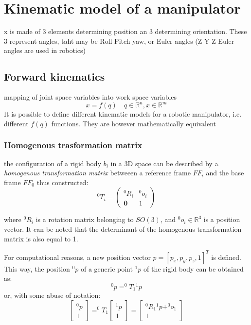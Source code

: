 \documentclass{book}
\begin{document}
\section{Kinematic model of a manipulator}

x is made of 3 elements determining position an 3 determining orientation. These 3 represent angles, taht may be Roll-Pitch-yaw, or Euler angles (Z-Y-Z Euler angles are used in robotics) 

\subsection{Forward kinematics}
mapping of joint space variables into work space variables
\[
    x=f(q) \quad q\in \mathbb{R}^n, x\in \mathbb{R}^m
\]
It is possible to define different kinematic models for a robotic manipulator, i.e. different $f(q)$ functions. They are however mathematically equivalent
\subsubsection{Homogenous trasformation matrix}
the configuration of a rigid body $b_i$ in a 3D space can be described by a \emph{homogenous transformation matrix} betweeen a reference frame $FF_i$ and the base frame $FF_0$ thus constructed: 
\[
    ^0T_i=\begin{pmatrix}
        ^0R_i & ^0o_i\\
        \mathbf{0} & 1
    \end{pmatrix}
\]

where $^0R_i$ is a rotation matrix belonging to $SO(3)$, and $^0o_i\in\mathbb{R}^3$ is a position vector. It can be noted that the determinant of the homogenous transformation matrix is also equal to 1.

For computational reasons, a new position vector $p=[p_x,p_y,p_z,1]^T$ is defined. This way, the position $^0p$ of a generic point $^1p$ of the rigid body can be obtained as:
\[
    ^0p=^0T_1 {^1}p
\]
or, with some abuse of notation:
\[
    \begin{bmatrix}
        ^0p \\ 1
    \end{bmatrix} = ^0T_1 \begin{bmatrix}
        ^1p \\ 1
    \end{bmatrix} = \begin{bmatrix}
        ^0R_1 {^1}p + ^0o_1\\
        1
    \end{bmatrix}
\]
\end{document}
